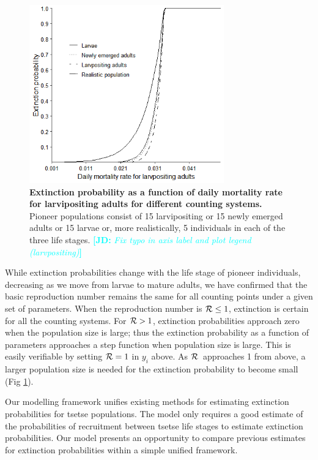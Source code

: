\documentclass[smallextended]{svjour3}
\newcommand{\comment}[3]{\textcolor{#1}{\textbf{[#2: }\textit{#3}\textbf{]}}}
\newcommand{\jd}[1]{\comment{cyan}{JD}{#1}}
\newcommand{\Rx}{\ensuremath{\cal R}}
\begin{document}
\begin{figure}[h]
	\includegraphics[width=0.75\textwidth]{Extinction15individuals.png}
	\caption{{\bf Extinction probability as a function of daily mortality rate for larvipositing adults for different counting systems.}  Pioneer populations consist of 15 larvipositing or 15 newly emerged adults or 15 larvae or, more realistically, 5 individuals in each of the three life stages.
	\jd{Fix typo in axis label and plot legend (larvpositing)}
	}

	\label{ExtLarviposMort15indiv}
\end{figure}

While extinction probabilities change with the life stage of pioneer individuals, decreasing as we move from larvae to mature adults,  we have confirmed that the basic reproduction number remains the same for all counting points under a given set of parameters. When the reproduction number is ${\cal R} \leq 1$, extinction is certain for all the counting systems. For ${\cal R} > 1 $, extinction probabilities approach zero when the population size is large; thus the extinction probability as a function of parameters approaches a step function when population size is large. This is easily verifiable by setting ${\cal R} =1$ in $y_i$ above.  As \Rx\ approaches 1 from above, a larger population size is needed for the extinction probability to become small (Fig  \ref{ExtLarviposMort15indiv}).

Our modelling framework unifies existing methods for estimating extinction probabilities for tsetse populations. The model only requires a good estimate of the probabilities of recruitment between tsetse life stages to estimate extinction probabilities. Our model presents an opportunity to compare previous estimates for extinction probabilities within a simple unified framework.
\end{document}
